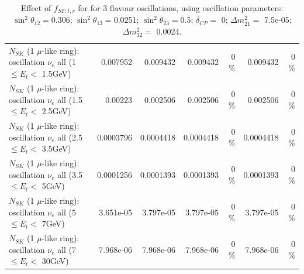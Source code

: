 \begin{table}
\begin{tabular}{| l | r | r | r  r | r  r |}
$N_{SK}$ (1 $\mu$-like ring): oscillation $\nu_{e}$ all (1 $\leq E_{t} <$ 1.5GeV) &        0.007952 &        0.009432 &        0.009432 &        0 \%  &        0.009432 &        0 \%  \\ 
$N_{SK}$ (1 $\mu$-like ring): oscillation $\nu_{e}$ all (1.5 $\leq E_{t} <$ 2.5GeV) &         0.00223 &        0.002506 &        0.002506 &        0 \%  &        0.002506 &        0 \%  \\ 
$N_{SK}$ (1 $\mu$-like ring): oscillation $\nu_{e}$ all (2.5 $\leq E_{t} <$ 3.5GeV) &       0.0003796 &       0.0004418 &       0.0004418 &        0 \%  &       0.0004418 &        0 \%  \\ 
$N_{SK}$ (1 $\mu$-like ring): oscillation $\nu_{e}$ all (3.5 $\leq E_{t} <$ 5GeV) &       0.0001256 &       0.0001393 &       0.0001393 &        0 \%  &       0.0001393 &        0 \%  \\ 
 $N_{SK}$ (1 $\mu$-like ring): oscillation $\nu_{e}$ all (5 $\leq E_{t} <$ 7GeV) &       3.651e-05 &       3.797e-05 &       3.797e-05 &        0 \%  &       3.797e-05 &        0 \%  \\ 
$N_{SK}$ (1 $\mu$-like ring): oscillation $\nu_{e}$ all (7 $\leq E_{t} <$ 30GeV) &       7.968e-06 &       7.968e-06 &       7.968e-06 &        0 \%  &       7.968e-06 &        0 \%  \\ 
\hline
\hline
\end{tabular}
\caption{ Effect of $f_{SF; t, r}$ for for 3 flavour oscillations, using oscillation parameters:  $\sin^2\theta_{12} = $0.306; $\sin^2\theta_{13} = $0.0251; $\sin^2\theta_{23} = $0.5; $\delta_{CP} = $        0; $\Delta m^2_{21} = $    7.5e-05; $\Delta m^2_{32} = $    0.0024. }
\label{tab:num_xsec_sf_1RmuT_3f_osc_t13:0.0251}
\end{table}
\clearpage
